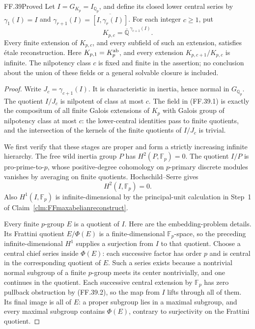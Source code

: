\begin{claim}{FF.39}{Proved}\label{clm:FFnilpotentreconstruct}
Let \(I=G_{K_p}=I_{\mathbb Q_p}\),
and define its closed lower central
series by
\(\gamma_1(I)=I\) and
\(\gamma_{r+1}(I)=\overline{[I,\gamma_r(I)]}\).
For each integer \(c\ge1\), put
\[
              K_{p,c}=
                \overline{\mathbb Q}^{\,\gamma_{c+1}(I)}.
                                                        \tag{FF.39.1}
\]
Every finite extension of \(K_{p,c}\),
and every subfield of such an extension,
satisfies \'etale reconstruction.
Here \(K_{p,1}=K_p^{\rm ab}\), and
every extension \(K_{p,c+1}/K_{p,c}\)
is infinite. The nilpotency class
\(c\) is fixed and finite in the
assertion; no conclusion about the
union of these fields or a general
solvable closure is included.
\end{claim}
\begin{proof}
Write \(J_c=\gamma_{c+1}(I)\).
It is characteristic in inertia,
hence normal in \(G_{\mathbb Q_p}\).
The quotient \(I/J_c\) is nilpotent
of class at most \(c\).
The field in (FF.39.1) is exactly
the compositum of all finite Galois
extensions of \(K_p\) with Galois
group of nilpotency class at most
\(c\): the lower-central identities
pass to finite quotients, and the
intersection of the kernels of the
finite quotients of \(I/J_c\) is
trivial.

We first verify that these stages
are proper and form a strictly
increasing infinite hierarchy.
The free wild inertia group \(P\)
has \(H^2(P,\mathbb F_p)=0\).
The quotient \(I/P\) is pro-prime-to-\(p\),
whose positive-degree cohomology
on \(p\)-primary discrete modules
vanishes by averaging on finite
quotients. Hochschild--Serre gives
\[
                   H^2(I,\mathbb F_p)=0.
                                                        \tag{FF.39.2}
\]
Also \(H^1(I,\mathbb F_p)\) is
infinite-dimensional by the principal-unit
calculation in Step~1 of
Claim~\ref{clm:FFmaxabelianreconstruct}.

Every finite \(p\)-group \(E\)
is a quotient of \(I\). Here are
the embedding-problem details.
Its Frattini quotient \(E/\Phi(E)\)
is a finite-dimensional \(\mathbb F_p\)-space,
so the preceding infinite-dimensional
\(H^1\) supplies a surjection from
\(I\) to that quotient. Choose a
central chief series inside
\(\Phi(E)\): each successive
factor has order \(p\) and is
central in the corresponding quotient
of \(E\). Such a series exists
because a nontrivial normal subgroup
of a finite \(p\)-group meets
its center nontrivially, and one
continues in the quotient. Each
successive central extension by
\(\mathbb F_p\) has zero pullback
obstruction by (FF.39.2), so the
map from \(I\) lifts through all
of them. Its final image is all
of \(E\): a proper subgroup lies
in a maximal subgroup, and every
maximal subgroup contains
\(\Phi(E)\), contrary to surjectivity
on the Frattini quotient.


\end{proof}
